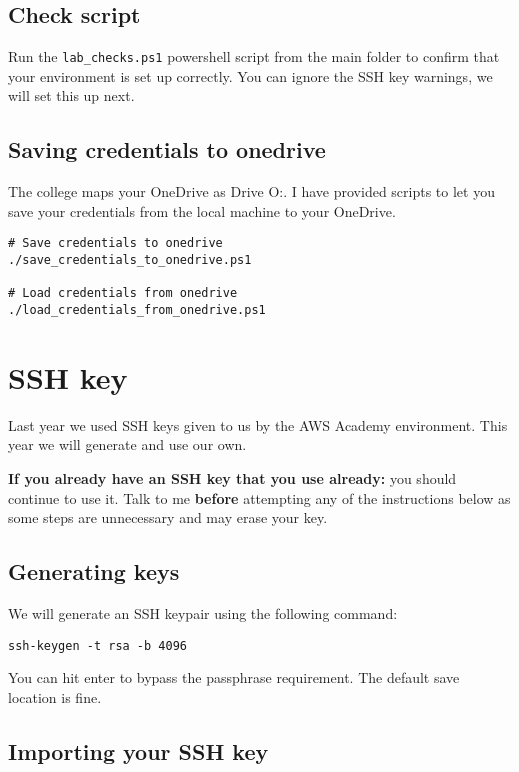 \subsection{Check script}\label{check-script}

Run the \texttt{lab\_checks.ps1} powershell script from the main folder to confirm that your environment is set up correctly.
You can ignore the SSH key warnings, we will set this up next.

\subsection{Saving credentials to onedrive}

The college maps your OneDrive as Drive O:.
I have provided scripts to let you save your credentials from the local machine to your OneDrive.
\begin{verbatim}
# Save credentials to onedrive
./save_credentials_to_onedrive.ps1

# Load credentials from onedrive
./load_credentials_from_onedrive.ps1
\end{verbatim}


\section{SSH key}

Last year we used SSH keys given to us by the AWS Academy environment.
This year we will generate and use our own.

\textbf{If you already have an SSH key that you use already:} you should continue to use it.
Talk to me \textbf{before} attempting any of the instructions below as some steps are unnecessary and may erase your key.

\subsection{Generating keys}

We will generate an SSH keypair using the following command:
\begin{verbatim}
ssh-keygen -t rsa -b 4096
\end{verbatim}
You can hit enter to bypass the passphrase requirement.
The default save location is fine.

\subsection{Importing your SSH key}

